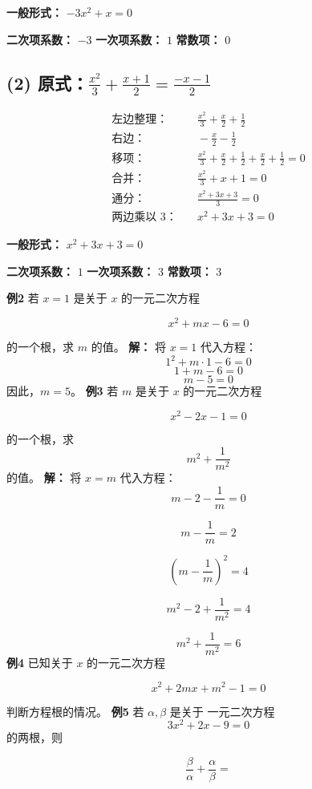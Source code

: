 \documentclass[12pt]{article}
\begin{document}
\textbf{一般形式：} \quad \( -3x^2 + x = 0 \)

\textbf{二次项系数：} \(-3\)
\textbf{一次项系数：} \(1\)
\textbf{常数项：} \(0\)

\vspace{1em}

\subsection*{(2) 原式：\quad \( \frac{x^2}{3} + \frac{x + 1}{2} = \frac{-x - 1}{2} \)}

\begin{align*}
  \text{左边整理：}   & \quad \frac{x^2}{3} + \frac{x}{2} + \frac{1}{2}                                 \\
  \text{右边：}     & \quad -\frac{x}{2} - \frac{1}{2}                                                \\
  \text{移项：}     & \quad \frac{x^2}{3} + \frac{x}{2} + \frac{1}{2} + \frac{x}{2} + \frac{1}{2} = 0 \\
  \text{合并：}     & \quad \frac{x^2}{3} + x + 1 = 0                                                 \\
  \text{通分：}     & \quad \frac{x^2 + 3x + 3}{3} = 0                                                \\
  \text{两边乘以 3：} & \quad x^2 + 3x + 3 = 0
\end{align*}

\textbf{一般形式：} \quad \( x^2 + 3x + 3 = 0 \)

\textbf{二次项系数：} \(1\)
\textbf{一次项系数：} \(3\)
\textbf{常数项：} \(3\) \newline


\textbf{例2} 若 \(x = 1\) 是关于 \(x\) 的一元二次方程


\[
  x^2 + mx - 6 = 0
\]


的一个根，求 \(m\) 的值。
\newline
\textbf{解：}
将 \(x = 1\) 代入方程：
\[
  1^2 + m \cdot 1 - 6 = 0
\]
\[
  1 + m - 6 = 0
\]
\[
  m - 5 = 0
\]
因此，\(m = 5\)。\newline
\textbf{例3} 若 \(m\) 是关于 \(x\) 的一元二次方程


\[
  x^2 -2x - 1 = 0
\]


的一个根，求 \[
  m^2+\frac{1}{m^2}  \]的值。
\newline
\textbf{解：}
将 \(x = m\) 代入方程：
\[
  m - 2 - \frac{1}{m} = 0
\]

\[
  m - \frac{1}{m} = 2
\]

\[
  \left(m - \frac{1}{m}\right)^2 = 4
\]

\[
  m^2 - 2 + \frac{1}{m^2} = 4
\]

\[
  m^2 + \frac{1}{m^2} = 6
\] \newline
\textbf{例4} 已知关于 \(x\) 的一元二次方程


\[
  x^2 +2mx +m^2 - 1 = 0
\]

判断方程根的情况。
\newline
\textbf{例5} 若 $\alpha, \beta$ 是关于 一元二次方程
\[
  3x^2 +2x -9 = 0
\]
的两根，则


\[
  \frac{\beta}{\alpha} + \frac{\alpha}{\beta} =
\]
\end{document}
